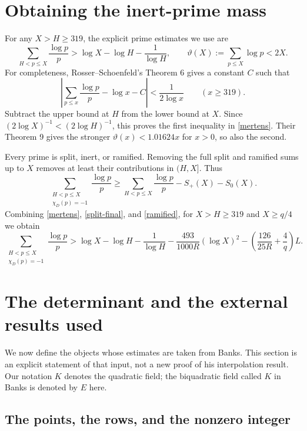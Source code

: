 \documentclass[11pt]{article}
\begin{document}
\section{Obtaining the inert-prime mass}\label{prime-mass}

For any \(X>H\ge319\), the explicit prime estimates we use are
\begin{equation}\label{mertens}
 \sum_{H<p\le X}\frac{\log p}{p}
 >\log X-\log H-\frac1{\log H},
 \qquad
 \vartheta(X):=\sum_{p\le X}\log p<2X.
\end{equation}
For completeness, Rosser--Schoenfeld's Theorem 6 \cite{rs} gives a constant \(C\)
such that
\[
 \left|\sum_{p\le x}\frac{\log p}{p}-\log x-C\right|
 <\frac1{2\log x}\qquad(x\ge319).
\]
Subtract the upper bound at \(H\) from the lower bound at \(X\).
Since \((2\log X)^{-1}<(2\log H)^{-1}\), this proves the first
inequality in \eqref{mertens}. Their Theorem 9 gives the stronger
\(\vartheta(x)<1.01624x\) for \(x>0\), so also the second.

Every prime is split, inert, or ramified. Removing the full split and
ramified sums up to \(X\) removes at least their contributions in
\((H,X]\). Thus
\[
 \sum_{\substack{H<p\le X\\\chi_D(p)=-1}}\frac{\log p}{p}
 \ge \sum_{H<p\le X}\frac{\log p}{p}-S_+(X)-S_0(X).
\]
Combining \eqref{mertens}, \eqref{split-final}, and \eqref{ramified},
for \(X>H\ge319\) and \(X\ge q/4\) we obtain
\begin{equation}\label{inert}
 \sum_{\substack{H<p\le X\\\chi_D(p)=-1}}\frac{\log p}{p}
 >\log X-\log H-\frac1{\log H}
  -\frac{493}{1000R}(\log X)^2
  -\left(\frac{126}{25R}+\frac4q\right)L.
\end{equation}

\section{The determinant and the external results used}\label{det-input}

We now define the objects whose estimates are taken from Banks. This
section is an explicit statement of that input, not a new proof of his
interpolation result. Our notation \(K\) denotes the quadratic field;
the biquadratic field called \(K\) in Banks is denoted by \(E\) here.

\subsection{The points, the rows, and the nonzero integer}
\end{document}
